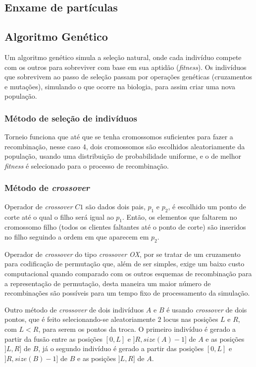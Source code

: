 \documentclass[conference]{IEEEtran}
\begin{document}
\subsection{Enxame de partículas}

\subsection{Algoritmo Genético}
\label{sec:alg_genetic}



Um algoritmo genético simula a seleção natural, onde cada indivíduo compete com os outros para sobreviver com base em sua aptidão (\emph{fitness}). Os indivíduos que sobrevivem ao passo de
seleção passam por operações genéticas (cruzamentos e mutações), simulando o que ocorre na biologia, para assim criar uma nova população.

    \subsubsection{Método de seleção de indivíduos}

        Torneio funciona que até que se tenha cromossomos suficientes para fazer a recombinação, nesse caso 4, dois cromossomos são escolhidos aleatoriamente da população, usando uma distribuição de
        probabilidade uniforme, e o de melhor \textit{fitness} é selecionado para o processo de recombinação.

    \subsubsection{Método de \textit{crossover}}

        Operador de \textit{crossover} $C1$ são dados dois pais, $p_1$ e $p_2$, é escolhido um ponto de corte até o qual o filho será igual ao $p_1$. Então, os elementos que faltarem no
        cromossomo filho (todos os clientes faltantes até o ponto de corte) são inseridos no filho seguindo a ordem em que aparecem em $p_2$. 

        Operador de \textit{crossover} do tipo \emph{crossover OX}, por se tratar de um cruzamento para codificação de permutação que, além de ser simples, exige um baixo custo computacional
        quando comparado com os outros esquemas de recombinação para a representação de permutação, desta maneira um maior número de recombinações são possíveis para um tempo fixo de processamento
        da simulação. 

        Outro método de \textit{crossover} de dois indivíduos $A$ e $B$ é usando \textit{crossover} de dois pontos, que é feito selecionando-se aleatoriamente $2$ locus nas posições $L$ e $R$,
        com $L < R$, para serem os pontos da troca.  O primeiro indivíduo é gerado a partir da fusão entre as posições $[0, L]$ e $]R, size(A) - 1]$ de $A$ e as posições $]L, R]$ de $B$, já
        o segundo indivíduo é gerado a partir das posições $[0, L]$ e $]R, size(B) - 1]$ de $B$ e as posições $]L, R]$ de $A$.
\end{document}
